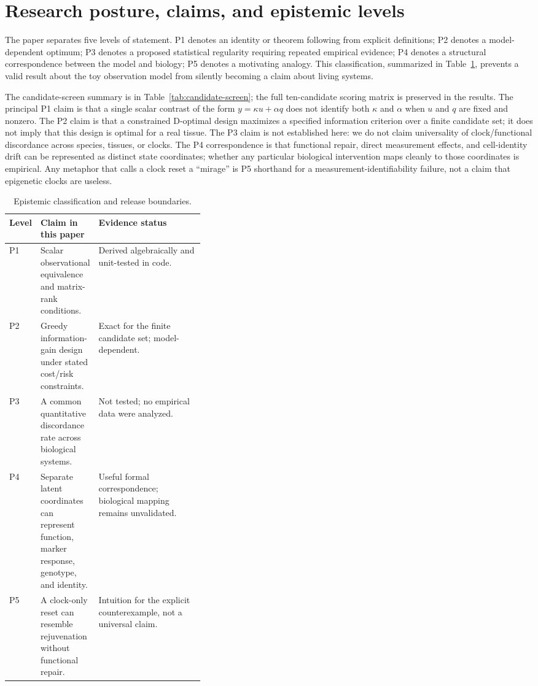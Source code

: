 \documentclass[10pt,a4paper]{article}
\begin{document}
\section{Research posture, claims, and epistemic levels}
The paper separates five levels of statement. P1 denotes an identity or theorem following from explicit definitions; P2 denotes a model-dependent optimum; P3 denotes a proposed statistical regularity requiring repeated empirical evidence; P4 denotes a structural correspondence between the model and biology; P5 denotes a motivating analogy. This classification, summarized in Table~\ref{tab:epistemic}, prevents a valid result about the toy observation model from silently becoming a claim about living systems.

The candidate-screen summary is in Table~\ref{tab:candidate-screen}; the full ten-candidate scoring matrix is preserved in the results. The principal P1 claim is that a single scalar contrast of the form \(y=\kappa u+\alpha q\) does not identify both \(\kappa\) and \(\alpha\) when \(u\) and \(q\) are fixed and nonzero. The P2 claim is that a constrained D-optimal design maximizes a specified information criterion over a finite candidate set; it does not imply that this design is optimal for a real tissue. The P3 claim is not established here: we do not claim universality of clock/functional discordance across species, tissues, or clocks. The P4 correspondence is that functional repair, direct measurement effects, and cell-identity drift can be represented as distinct state coordinates; whether any particular biological intervention maps cleanly to those coordinates is empirical. Any metaphor that calls a clock reset a “mirage” is P5 shorthand for a measurement-identifiability failure, not a claim that epigenetic clocks are useless.

\begin{table}[!htbp]
\centering
\caption{Epistemic classification and release boundaries.}
\label{tab:epistemic}
\small
\begin{tabularx}{\linewidth}{p{0.09\linewidth} p{0.28\linewidth} X}
\toprule
\textbf{Level} & \textbf{Claim in this paper} & \textbf{Evidence status} \\
\midrule
P1 & Scalar observational equivalence and matrix-rank conditions. & Derived algebraically and unit-tested in code. \\
P2 & Greedy information-gain design under stated cost/risk constraints. & Exact for the finite candidate set; model-dependent. \\
P3 & A common quantitative discordance rate across biological systems. & Not tested; no empirical data were analyzed. \\
P4 & Separate latent coordinates can represent function, marker response, genotype, and identity. & Useful formal correspondence; biological mapping remains unvalidated. \\
P5 & A clock-only reset can resemble rejuvenation without functional repair. & Intuition for the explicit counterexample, not a universal claim. \\
\bottomrule
\end{tabularx}
\end{table}
\end{document}
